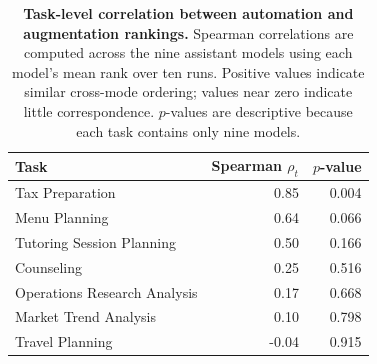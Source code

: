 \begin{table}[htbp]
    \centering
    \small
    \begin{tabular}{lrr}
        \toprule
        Task & Spearman $\rho_t$ & $p$-value \\
        \midrule
        Tax Preparation & 0.85 & 0.004 \\
        Menu Planning & 0.64 & 0.066 \\
        Tutoring Session Planning & 0.50 & 0.166 \\
        Counseling & 0.25 & 0.516 \\
        Operations Research Analysis & 0.17 & 0.668 \\
        Market Trend Analysis & 0.10 & 0.798 \\
        Travel Planning & -0.04 & 0.915 \\
        \bottomrule
    \end{tabular}
    \caption{\textbf{Task-level correlation between automation and augmentation rankings.} Spearman correlations are computed across the nine assistant models using each model's mean rank over ten runs. Positive values indicate similar cross-mode ordering; values near zero indicate little correspondence. $p$-values are descriptive because each task contains only nine models.}
    \label{tab:mode-correlations}
\end{table}
